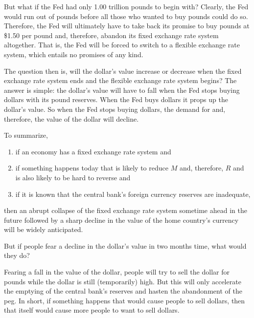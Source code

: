 \documentclass[
  letterpaper,
]{book}
\providecommand{\tightlist}{%
  \setlength{\itemsep}{0pt}\setlength{\parskip}{0pt}}\usepackage{longtable,booktabs,array}
\theoremstyle{plain}
\theoremstyle{remark}
\begin{document}
But what if the Fed had only 1.00 trillion pounds to begin with?
Clearly, the Fed would run out of pounds before all those who wanted to
buy pounds could do so. Therefore, the Fed will ultimately have to take
back its promise to buy pounds at \$1.50 per pound and, therefore,
abandon its fixed exchange rate system altogether. That is, the Fed will
be forced to switch to a flexible exchange rate system, which entails no
promises of any kind.

The question then is, will the dollar's value increase or decrease when
the fixed exchange rate system ends and the flexible exchange rate
system begins? The answer is simple: the dollar's value will have to
fall when the Fed stops buying dollars with its pound reserves. When the
Fed buys dollars it props up the dollar's value. So when the Fed stops
buying dollars, the demand for and, therefore, the value of the dollar
will decline.

To summarize,

\begin{enumerate}
\def\labelenumi{\arabic{enumi}.}
\tightlist
\item
  if an economy has a fixed exchange rate system and
\item
  if something happens today that is likely to reduce \(M\) and,
  therefore, \(R\) and is also likely to be hard to reverse and
\item
  if it is known that the central bank's foreign currency reserves are
  inadequate,
\end{enumerate}

then an abrupt collapse of the fixed exchange rate system sometime ahead
in the future followed by a sharp decline in the value of the home
country's currency will be widely anticipated.

But if people fear a decline in the dollar's value in two months time,
what would they do?

Fearing a fall in the value of the dollar, people will try to sell the
dollar for pounds while the dollar is still (temporarily) high. But this
will only accelerate the emptying of the central bank's reserves and
hasten the abandonment of the peg. In short, if something happens that
would cause people to sell dollars, then that itself would cause more
people to want to sell dollars.
\end{document}
